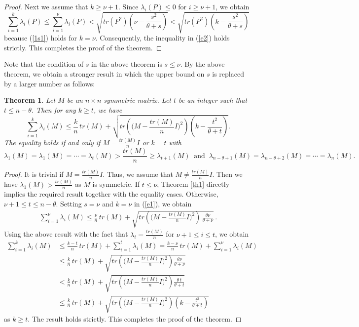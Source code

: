 \documentclass[12pt]{article}
\newtheorem{theorem}{Theorem}[section]
\begin{document}
\begin{proof}
 \vspace*{3mm}

Next we assume that $k\geq \nu+1$. Since $\lambda_i(P)\leq 0$ for $i\geq \nu+1$, we obtain
$$\sum_{i=1}^{k}\lambda_i(P)\leq \sum_{i=1}^{\nu}\lambda_i(P)<\sqrt{tr(P^2)\left(\nu-\frac{s^2}{\theta+s}\right)}<\sqrt{tr(P^2)\left(k-\frac{s^2}{\theta+s}\right)}$$
because (\ref{1s1}) holds for $k=\nu$. Consequently, the inequality in (\ref{e2}) holds strictly. This completes the proof of the theorem.
\end{proof}

 Note that the condition of $s$ in the above theorem is $s\leq \nu$. By the above theorem, we obtain a stronger result in which  the upper bound on $s$ is replaced by a larger number  as follows:
 \begin{theorem} \label{th3} Let $M$ be an $n\times n$ symmetric matrix. Let $t$ be an integer such that $t\leq n-\theta$. Then for any $k\geq t$, we have
 \begin{equation*}
 \sum_{i=1}^{k}\lambda_i(M)\leq\frac{k}{n}\,tr(M)+\sqrt{tr\left(\Big(M-\frac{tr(M)}{n}I\Big)^2\right)\left(k-\frac{t^2}{\theta+t}\right)}.
 \end{equation*}
 The equality holds if and only if $M=\frac{tr(M)}{n}I$ or $k=t$ with 
 $$\lambda_1(M)=\lambda_1(M)=\cdots=\lambda_t(M)> \frac{tr(M)}{n}\geq\lambda_{t+1}(M)~\mbox{ and }~\lambda_{n-\theta+1}(M)=\lambda_{n-\theta+2}(M)=\cdots=\lambda_n(M).$$
 \end{theorem}

 \begin{proof} It is trivial if $M=\frac{tr(M)}{n}I$. Thus, we assume that $M\neq\frac{tr(M)}{n}I$. Then we have $\lambda_1(M)>\frac{tr(M)}{n}$ as $M$ is symmetric.
 If $t\leq \nu$, Theorem \ref{th1} directly implies the required result together with the equality cases.
 Otherwise, $\nu+1\leq t\leq n-\theta$.
Setting $s=\nu$ and $k=\nu$ in (\ref{e1}), we obtain
\begin{align*}
 \sum_{i=1}^{\nu}\lambda_i(M)\leq\frac{\nu}{n}\,tr(M)+\sqrt{tr\left(\Big(M-\frac{tr(M)}{n}I\Big)^2\right)\,\frac{\theta\nu}{\theta+\nu}}\,. 
\end{align*}
Using the above result with the fact that $\lambda_{i}=\frac{tr(M)}{n}$ for $\nu+1\leq i\leq t$, we obtain
 \begin{align}
  \sum_{i=1}^{k}\lambda_i(M)&\leq\frac{k-t}{n}\,tr(M)+ \sum_{i=1}^{t}\lambda_i(M)=\frac{k-\nu}{n}\,tr(M)+\sum_{i=1}^{\nu}\lambda_i(M)\nonumber\\[3mm]
  &\leq\frac{k}{n}\,tr(M)+\sqrt{tr\left(\Big(M-\frac{tr(M)}{n}I\Big)^2\right)\frac{\theta\nu}{\theta+\nu}}\nonumber\\[3mm]
  &<\frac{k}{n}\,tr(M)+\sqrt{tr\left(\Big(M-\frac{tr(M)}{n}I\Big)^2\right)\frac{\theta\,t}{\theta+t}}\nonumber\\[3mm]
   &\leq \frac{k}{n}\,tr(M)+\sqrt{tr\left(\Big(M-\frac{tr(M)}{n}I\Big)^2\right)\left(k-\frac{t^2}{\theta+t}\right)}\nonumber
 \end{align}
as $k\geq t$. The result holds strictly. This completes the proof of the theorem.
 \end{proof}
\end{document}
